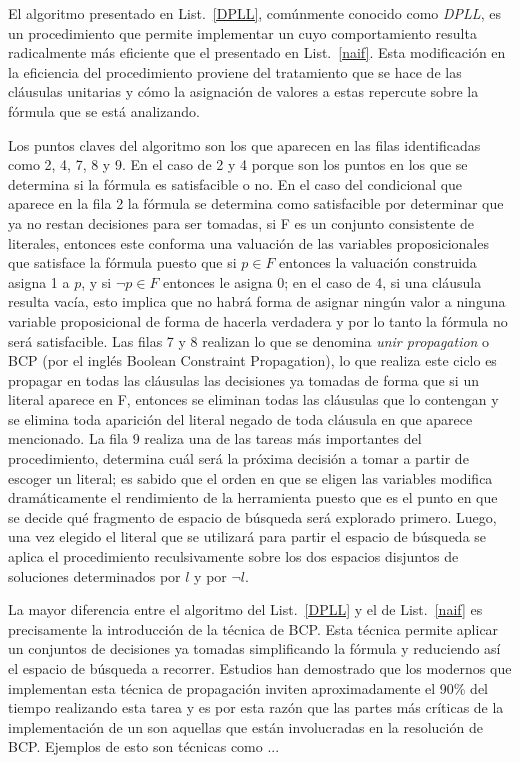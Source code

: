 El algoritmo presentado en List.~\ref{DPLL}, comúnmente conocido como \emph{DPLL}, es un procedimiento que permite implementar un \ssolver cuyo comportamiento resulta radicalmente más eficiente que el presentado en List.~\ref{naif}. Esta modificación en la eficiencia del procedimiento proviene del tratamiento que se hace de las cláusulas unitarias y cómo la asignación de valores a estas repercute sobre la fórmula que se está analizando. 

Los puntos claves del algoritmo son los que aparecen en las filas identificadas como 2, 4, 7, 8 y 9. En el caso de 2 y 4 porque son los puntos en los que se determina si la fórmula es satisfacible o no. En el caso del condicional que aparece en la fila 2 la fórmula se determina como satisfacible por determinar que ya no restan decisiones para ser tomadas, si F es un conjunto consistente de literales, entonces este conforma una valuación de las variables proposicionales que satisface la fórmula puesto que si $p \in F$ entonces la valuación construida asigna 1 a $p$, y si $\neg p \in F$ entonces le asigna 0; en el caso de 4, si una cláusula resulta vacía, esto implica que no habrá forma de asignar ningún valor a ninguna variable proposicional de forma de hacerla verdadera y por lo tanto la fórmula no será satisfacible. Las filas 7 y 8 realizan lo que se denomina \emph{unir propagation} o BCP (por el inglés Boolean Constraint Propagation), lo que realiza este ciclo es propagar en todas las cláusulas las decisiones ya tomadas de forma que si un literal aparece en F, entonces se eliminan todas las cláusulas que lo contengan y se elimina toda aparición del literal negado de toda cláusula en que aparece mencionado. La fila 9 realiza una de las tareas más importantes del procedimiento, determina cuál será la próxima decisión a tomar a partir de escoger un literal; es sabido que el orden en que se eligen las variables modifica dramáticamente el rendimiento de la herramienta puesto que es el punto en que se decide qué fragmento de espacio de búsqueda será explorado primero. Luego, una vez elegido el literal que se utilizará para partir el espacio de búsqueda se aplica el procedimiento reculsivamente sobre los dos espacios disjuntos de soluciones determinados por $l$ y por $\neg l$.

La mayor diferencia entre el algoritmo del List.~\ref{DPLL} y el de List.~\ref{naif} es precisamente la introducción de la técnica de BCP. Esta técnica permite aplicar un conjuntos de decisiones ya tomadas simplificando la fórmula y reduciendo así el espacio de búsqueda a recorrer. Estudios han demostrado que los \ssolver modernos que implementan esta técnica de propagación inviten aproximadamente el 90\% del tiempo realizando esta tarea\cite{???} y es por esta razón que las partes más críticas de la implementación de un \ssolver son aquellas que están involucradas en la resolución de BCP. Ejemplos de esto son técnicas como ...


